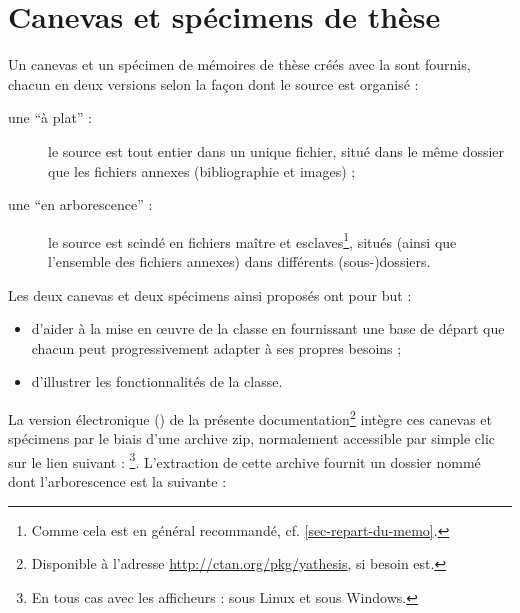 \chapter{Canevas et spécimens de thèse}\label{cha-specimen-canevas}%

Un canevas et un spécimen de mémoires de thèse créés avec la \yatCl sont
fournis, chacun en deux versions selon la façon dont le source  est
organisé :
\begin{description}
\item[une \enquote{à plat} :] le source est tout entier dans un unique fichier,
  situé dans le même dossier que les fichiers annexes (bibliographie et
  images) ;
\item[une \enquote{en arborescence} :] le source est scindé en fichiers maître
  et esclaves\footnote{Comme cela est en général recommandé,
    cf. \vref{sec-repart-du-memo}.}, situés (ainsi que l'ensemble des fichiers
  annexes) dans différents (sous-)dossiers.
\end{description}
Les deux canevas et deux spécimens ainsi proposés ont pour but :
\begin{itemize}
\item d'aider à la mise en œuvre de la classe en fournissant une base de départ
  que chacun peut progressivement adapter à ses propres
  besoins ;
\item d'illustrer les fonctionnalités de la classe.
\end{itemize}

La version électronique (\pdf{}) de la présente
documentation\footnote{Disponible à l'adresse
  \url{http://ctan.org/pkg/yathesis}, si besoin est.} intègre ces canevas et
spécimens par le biais d'une archive \gls{zip}, normalement accessible par
simple clic sur le lien suivant :
\footnote{En
  tous cas avec les afficheurs \pdf:{}  sous Linux et
  \href{http://www.sumatrapdfreader.org/free-pdf-reader-fr.html}{}
  sous Windows.}. L'extraction
de cette archive fournit un dossier nommé  dont l'arborescence
est la suivante :

\setlength{\DTbaselineskip}{15pt}
\begin{tcolorbox}
\end{tcolorbox}

